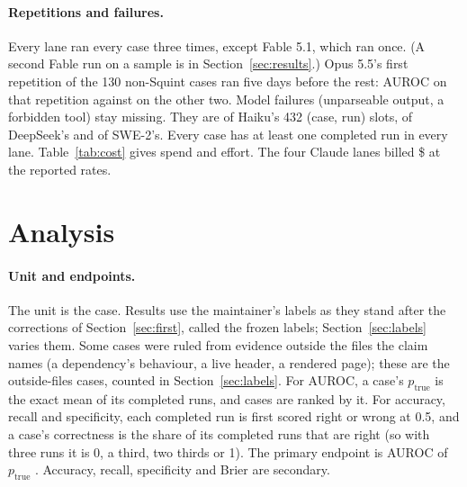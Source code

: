 \documentclass[11pt]{article}
\begin{document}
\paragraph{Repetitions and failures.} Every lane ran every case three times, except Fable 5.1, which ran once. (A second Fable run on a sample is in Section~\ref{sec:results}.) Opus 5.5's first repetition of the 130 non-Squint cases ran five days before the rest: AUROC  on that repetition against  on the other two. Model failures (unparseable output, a forbidden tool) stay missing. They are  of Haiku's 432 (case, run) slots,  of DeepSeek's and  of SWE-2's. Every case has at least one completed run in every lane. Table~\ref{tab:cost} gives spend and effort. The four Claude lanes billed \$ at the reported rates.

\begin{table}[h]
\centering\small
\resizebox{\textwidth}{!}{}
\caption{Spend and effort per lane over completed runs. The Claude lanes bill the Anthropic API at the reported figure. $^\ast$The DeepSeek figure is the harness's estimate at Anthropic list prices, not the provider's bill. The SWE-2 lane ran on a free tier. Verdict agreement scores the bare verdict against the label.}
\label{tab:cost}
\end{table}

\section{Analysis}
\label{sec:analysis}

\paragraph{Unit and endpoints.} The unit is the case. Results use the maintainer's labels as they stand after the corrections of Section~\ref{sec:first}, called the frozen labels; Section~\ref{sec:labels} varies them. Some cases were ruled from evidence outside the files the claim names (a dependency's behaviour, a live header, a rendered page); these are the outside-files cases, counted in Section~\ref{sec:labels}. For AUROC, a case's $p_{\text{true}}$ is the exact mean of its completed runs, and cases are ranked by it. For accuracy, recall and specificity, each completed run is first scored right or wrong at 0.5, and a case's correctness is the share of its completed runs that are right (so with three runs it is 0, a third, two thirds or 1). The primary endpoint is AUROC of $p_{\text{true}}$ \citep{hanley1982}. Accuracy, recall, specificity and Brier are secondary.
\end{document}
